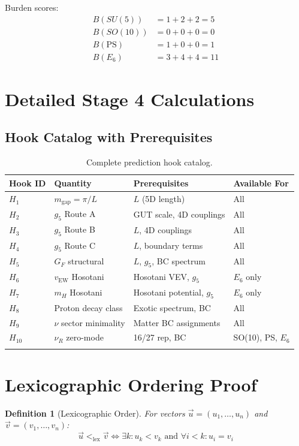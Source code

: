 \documentclass[11pt,a4paper]{article}
\newtheorem{definition}{Definition}[section]
\begin{document}
Burden scores:
\begin{align}
\label{eq:burden-all}
B(SU(5)) &= 1 + 2 + 2 = 5 \\
B(SO(10)) &= 0 + 0 + 0 = 0 \\
B(\text{PS}) &= 1 + 0 + 0 = 1 \\
B(E_6) &= 3 + 4 + 4 = 11
\end{align}

\section{Detailed Stage 4 Calculations}
\label{app:stage4-detail}

\subsection{Hook Catalog with Prerequisites}
\label{app:hook-catalog}

\begin{longtable}{llll}
\toprule
Hook ID & Quantity & Prerequisites & Available For \\
\midrule
\endhead
$H_1$ & $m_{\text{gap}} = \pi/L$ & $L$ (5D length) & All \\
$H_2$ & $g_5$ Route A & GUT scale, 4D couplings & All \\
$H_3$ & $g_5$ Route B & $L$, 4D couplings & All \\
$H_4$ & $g_5$ Route C & $L$, boundary terms & All \\
$H_5$ & $G_F$ structural & $L$, $g_5$, BC spectrum & All \\
$H_6$ & $v_{\text{EW}}$ Hosotani & Hosotani VEV, $g_5$ & $E_6$ only \\
$H_7$ & $m_H$ Hosotani & Hosotani potential, $g_5$ & $E_6$ only \\
$H_8$ & Proton decay class & Exotic spectrum, BC & All \\
$H_9$ & $\nu$ sector minimality & Matter BC assignments & All \\
$H_{10}$ & $\nu_R$ zero-mode & 16/27 rep, BC & SO(10), PS, $E_6$ \\
\bottomrule
\caption{Complete prediction hook catalog.}
\label{tab:hook-catalog}
\end{longtable}

\section{Lexicographic Ordering Proof}
\label{app:lex-proof}

\begin{definition}[Lexicographic Order]
\label{def:lex-order}
For vectors $\vec{u} = (u_1, \ldots, u_n)$ and $\vec{v} = (v_1, \ldots, v_n)$:
\begin{equation}
\label{eq:lex-order-def}
\vec{u} <_{\text{lex}} \vec{v} \iff \exists k : u_k < v_k \text{ and } \forall i < k : u_i = v_i
\end{equation}
\end{definition}
\end{document}
